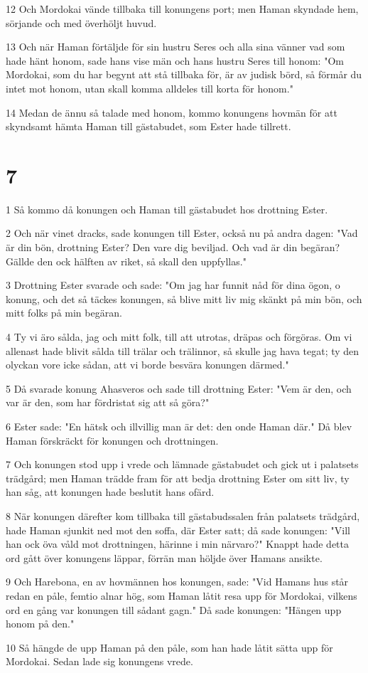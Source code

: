 \par 12 Och Mordokai vände tillbaka till konungens port; men Haman skyndade hem, sörjande och med överhöljt huvud.
\par 13 Och när Haman förtäljde för sin hustru Seres och alla sina vänner vad som hade hänt honom, sade hans vise män och hans hustru Seres till honom: "Om Mordokai, som du har begynt att stå tillbaka för, är av judisk börd, så förmår du intet mot honom, utan skall komma alldeles till korta för honom."
\par 14 Medan de ännu så talade med honom, kommo konungens hovmän för att skyndsamt hämta Haman till gästabudet, som Ester hade tillrett.

\chapter{7}

\par 1 Så kommo då konungen och Haman till gästabudet hos drottning Ester.
\par 2 Och när vinet dracks, sade konungen till Ester, också nu på andra dagen: "Vad är din bön, drottning Ester? Den vare dig beviljad. Och vad är din begäran? Gällde den ock hälften av riket, så skall den uppfyllas."
\par 3 Drottning Ester svarade och sade: "Om jag har funnit nåd för dina ögon, o konung, och det så täckes konungen, så blive mitt liv mig skänkt på min bön, och mitt folks på min begäran.
\par 4 Ty vi äro sålda, jag och mitt folk, till att utrotas, dräpas och förgöras. Om vi allenast hade blivit sålda till trälar och trälinnor, så skulle jag hava tegat; ty den olyckan vore icke sådan, att vi borde besvära konungen därmed."
\par 5 Då svarade konung Ahasveros och sade till drottning Ester: "Vem är den, och var är den, som har fördristat sig att så göra?"
\par 6 Ester sade: "En hätsk och illvillig man är det: den onde Haman där." Då blev Haman förskräckt för konungen och drottningen.
\par 7 Och konungen stod upp i vrede och lämnade gästabudet och gick ut i palatsets trädgård; men Haman trädde fram för att bedja drottning Ester om sitt liv, ty han såg, att konungen hade beslutit hans ofärd.
\par 8 När konungen därefter kom tillbaka till gästabudssalen från palatsets trädgård, hade Haman sjunkit ned mot den soffa, där Ester satt; då sade konungen: "Vill han ock öva våld mot drottningen, härinne i min närvaro?" Knappt hade detta ord gått över konungens läppar, förrän man höljde över Hamans ansikte.
\par 9 Och Harebona, en av hovmännen hos konungen, sade: "Vid Hamans hus står redan en påle, femtio alnar hög, som Haman låtit resa upp för Mordokai, vilkens ord en gång var konungen till sådant gagn." Då sade konungen: "Hängen upp honom på den."
\par 10 Så hängde de upp Haman på den påle, som han hade låtit sätta upp för Mordokai. Sedan lade sig konungens vrede.

